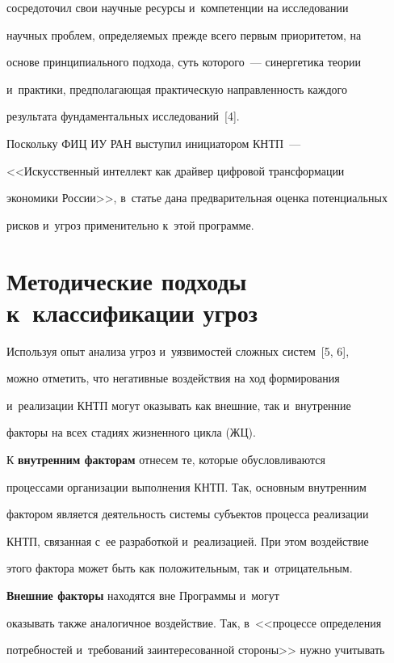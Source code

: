 сосредоточил свои научные ресурсы и~компетенции на исследовании 

научных проблем, определяемых прежде всего первым приоритетом, на 

основе принципиального подхода, суть которого~--- синергетика теории 

и~практики, предполагающая практическую направленность каждого 

результата фундаментальных исследований~[4]. 

    

    Поскольку ФИЦ ИУ РАН выступил инициатором КНТП~---  

<<Искусственный интеллект как драйвер цифровой трансформации 

экономики России>>, в~\mbox{статье} дана предварительная оценка потенциальных 

рисков и~угроз применительно к~этой программе. 

    

\section{Методические подходы к~классификации угроз}



    Используя опыт анализа угроз и~уязвимостей сложных систем~[5, 6], 

можно отметить, что негативные воздействия на ход формирования 

и~реализации КНТП могут оказывать как внешние, так и~внутренние 

факторы на всех стадиях жизненного цикла (ЖЦ). 

    

    К \textbf{внутренним факторам} отнесем те, которые обусловливаются 

процессами организации выполнения КНТП. Так, основным внутренним 

фактором является деятельность системы субъектов процесса реализации 

КНТП, связанная с~ее разработкой и~реализацией. При этом воздействие 

этого фактора может быть как положительным, так и~отрицательным. 

    

    \textbf{Внешние факторы} находятся вне Программы и~могут 

оказывать также аналогичное воздействие. Так, в~<<процессе определения 

потребностей и~требований заинтересованной стороны>> нужно учитывать 

